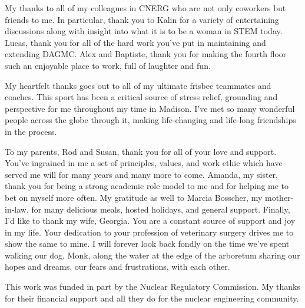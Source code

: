 My thanks to all of my colleagues in CNERG who are not only coworkers but
friends to me. In particular, thank you to Kalin for a variety of entertaining
discussions along with insight into what it is to be a woman in STEM
today. Lucas, thank you for all of the hard work you've put in maintaining and
extending DAGMC. Alex and Baptiste, thank you for making the fourth floor such
an enjoyable place to work, full of laughter and fun.

My heartfelt thanks goes out to all of my ultimate frisbee teammates and
coaches. This sport has been a critical source of stress relief, grounding and
perspective for me throughout my time in Madison. I've met so many wonderful
people across the globe through it, making life-changing and life-long
friendships in the process.

To my parents, Rod and Susan, thank you for all of your love and support. You've
ingrained in me a set of principles, values, and work ethic which have served me
will for many years and many more to come. Amanda, my sister, thank you for
being a strong academic role model to me and for helping me to bet on myself
more often. My gratitude as well to Marcia Bosscher, my mother-in-law, for many delicious
meals, hosted holidays, and general support. Finally, I'd like to thank my wife,
Georgia. You are a constant source of support and joy in my life. Your
dedication to your profession of veterinary surgery drives me to show the same
to mine. I will forever look back fondly on the time we've spent walking
our dog, Monk, along the water at the edge of the arboretum sharing our hopes
and dreams, our fears and frustrations, with each other.

This work was funded in part by the Nuclear Regulatory
Commission. My thanks for their financial support and all they do for the
nuclear engineering community.

